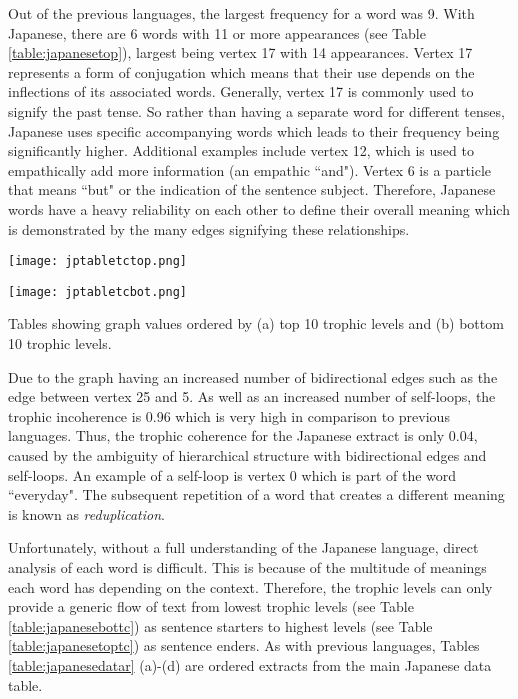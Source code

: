 Out of the previous languages, the largest frequency for a word was 9. With Japanese, there are 6 words with 11 or more appearances (see Table \ref{table:japanesetop}), largest being vertex 17 with 14 appearances. Vertex 17 represents a form of conjugation which means that their use depends on the inflections of its associated words. Generally, vertex 17 is commonly used to signify the past tense. So rather than having a separate word for different tenses, Japanese uses specific accompanying words which leads to their frequency being significantly higher. Additional examples include vertex 12, which is used to empathically add more information (an empathic ``and"). Vertex 6 is a particle that means ``but" or the indication of the sentence subject. Therefore, Japanese words have a heavy reliability on each other to define their overall meaning which is demonstrated by the many edges signifying these relationships.

\begin{table}[!htb]
\centering
\begin{subtable}{.45\textwidth}
	\centering
	\texttt{[image: jptabletctop.png]}
	\caption{}
	\label{table:japanesetoptc}
\end{subtable}
\hfill
\begin{subtable}{.45\textwidth}
	\centering
	\texttt{[image: jptabletcbot.png]}
	\caption{}
	\label{table:japanesebottc}
\end{subtable}
\caption{Tables showing graph values ordered by (a) top 10 trophic levels and (b) bottom 10 trophic levels.}
\end{table}

Due to the graph having an increased number of bidirectional edges such as the edge between vertex 25 and 5. As well as an increased number of self-loops, the trophic incoherence is 0.96 which is very high in comparison to previous languages. Thus, the trophic coherence for the Japanese extract is only $0.04$, caused by the ambiguity of hierarchical structure with bidirectional edges and self-loops. An example of a self-loop is vertex 0 which is part of the word ``everyday". The subsequent repetition of a word that creates a different meaning is known as \emph{reduplication}.

Unfortunately, without a full understanding of the Japanese language, direct analysis of each word is difficult. This is because of the multitude of meanings each word has depending on the context. Therefore, the trophic levels can only provide a generic flow of text from lowest trophic levels (see Table \ref{table:japanesebottc}) as sentence starters to highest levels (see Table \ref{table:japanesetoptc})  as sentence enders. As with previous languages, Tables \ref{table:japanesedatar} (a)-(d) are ordered extracts from the main Japanese data table.

